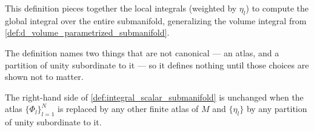 This definition pieces together the local integrals (weighted by $\eta_l$) to compute the global integral over the entire submanifold, generalizing the volume integral from \cref{def:d_volume_parametrized_submanifold}.

The definition names two things that are not canonical --- an atlas, and a partition of unity
subordinate to it --- so it defines nothing until those choices are shown not to matter.

\begin{proposition}
\label{prop:integral_over_submanifold_well_defined}
The right-hand side of \cref{def:integral_scalar_submanifold} is unchanged when the atlas
$\{\Phi_l\}_{l=1}^N$ is replaced by any other finite atlas of $M$ and $\{\eta_l\}$ by any
partition of unity subordinate to it.
\end{proposition}


